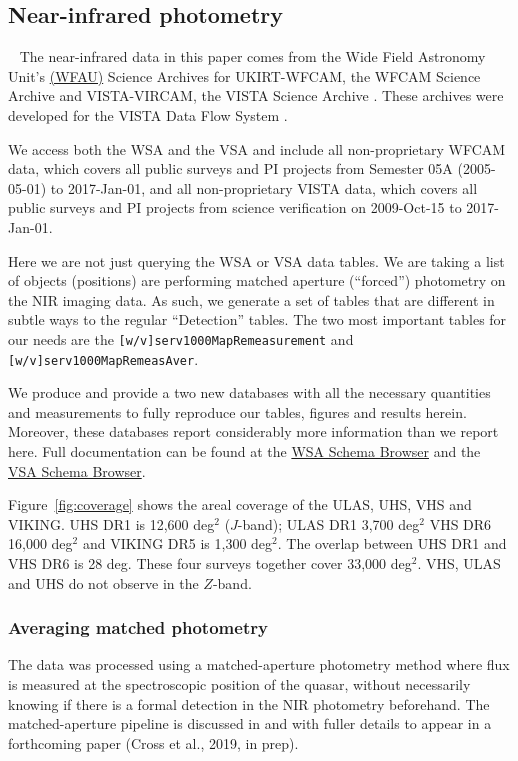 \documentclass[usenatbib]{mnras}
\begin{document}
\subsection{Near-infrared photometry}~\label{sec:NIR_data} 
The near-infrared data in this paper comes from the Wide Field
Astronomy Unit's \href{https://www.roe.ac.uk/ifa/wfau/}{(WFAU)}
Science Archives for UKIRT-WFCAM, the WFCAM Science Archive
\citep[WSA; ][]{Hambly2008} and VISTA-VIRCAM, the VISTA Science
Archive \citep[VSA; ][]{Cross2012}. These archives were developed for
the VISTA Data Flow System \citep[VDFS][]{VDFS}.

We access both the WSA and the VSA and include all non-proprietary
WFCAM data, which covers all public surveys and PI projects from
Semester 05A (2005-05-01) to 2017-Jan-01, and all non-proprietary VISTA data, which
covers all public surveys and PI projects from science verification on
2009-Oct-15 to 2017-Jan-01.

Here we are not just querying the WSA or VSA data tables. We are
taking a list of objects (positions) are performing matched aperture
(``forced'') photometry on the NIR imaging data. As such, we generate
a set of tables that are different in subtle ways to the regular
``Detection'' tables.  The two most important tables for our needs are
the {\tt [w/v]serv1000MapRemeasurement} and {\tt
[w/v]serv1000MapRemeasAver}.

We produce and provide a two new databases with all the necessary
quantities and measurements to fully reproduce our tables, figures and
results herein. Moreover, these databases report considerably more
information than we report here. Full documentation can be found at
the \href{http://wsa.roe.ac.uk/www/wsa_browser.html}{WSA Schema
Browser} and the
\href{http://horus.roe.ac.uk/vsa/www/vsa_browser.html}{VSA Schema
Browser}.

Figure~\ref{fig:coverage} shows the areal coverage of the ULAS, UHS,
VHS and VIKING. UHS DR1 is 12,600 deg$^{2}$ ($J$-band); ULAS DR1 3,700
deg$^{2}$ VHS DR6 16,000 deg$^{2}$ and VIKING DR5 is 1,300
deg$^{2}$. The overlap between UHS DR1 and VHS DR6 is 28 deg. These
four surveys together cover 33,000 deg$^{2}$. VHS, ULAS and UHS do not
observe in the $Z$-band.


  \subsubsection{Averaging matched photometry}
  The data was processed using a matched-aperture photometry method
  where flux is measured at the spectroscopic position of the quasar,
  without necessarily knowing if there is a formal detection in the NIR
  photometry beforehand. The matched-aperture pipeline is discussed in
  \citet{Cross2013} and with fuller details to appear in a forthcoming
  paper (Cross et al., 2019, in prep).
  
\end{document}

